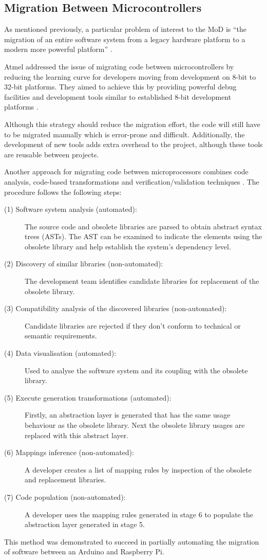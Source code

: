 \documentclass{UoYCSproject}
\begin{document}
\subsection{Migration Between Microcontrollers} \label{mc_migration}
As mentioned previously, a particular problem of interest to the MoD is ``the migration of an entire software system from a legacy hardware platform to a modern more powerful platform'' \parencite{gerasimou2017technical}.

Atmel addressed the issue of migrating code between microcontrollers by reducing the learning curve for developers moving from development on 8-bit to 32-bit platforms. They aimed to achieve this by providing powerful debug facilities and development tools similar to established 8-bit development platforms \parencite{wilbrink2004facilitating}.

Although this strategy should reduce the migration effort, the code will still have to be migrated manually which is error-prone and difficult. Additionally, the development of new tools adds extra overhead to the project, although these tools are reusable between projects.

Another approach for migrating code between microprocessors combines code analysis, code-based transformations and verification/validation techniques \parencite{gerasimou2017technical}. The procedure follows the following steps:
\begin{description}
\item[(1) Software system analysis (automated):] The source code and obsolete libraries are parsed to obtain abstract syntax trees (ASTs). The AST can be examined to indicate the elements using the obsolete library and help establish the system's dependency level.
\item[(2) Discovery of similar libraries (non-automated):] The development team identifies candidate libraries for replacement of the obsolete library.
\item[(3) Compatibility analysis of the discovered libraries (non-automated):] Candidate libraries are rejected if they don't conform to technical or semantic requirements.
\item[(4) Data visualisation (automated):] Used to analyse the software system and its coupling with the obsolete library.
\item[(5) Execute generation transformations (automated):] Firstly, an abstraction layer is generated that has the same usage behaviour as the obsolete library. Next the obsolete library usages are replaced with this abstract layer.
\item[(6) Mappings inference (non-automated):] A developer creates a list of mapping rules by inspection of the obsolete and replacement libraries.
\item[(7) Code population (non-automated):] A developer uses the mapping rules generated in stage 6 to populate the abstraction layer generated in stage 5.
\end{description}
This method was demonstrated to succeed in partially automating the migration of software between an Arduino and Raspberry Pi.
\end{document}
